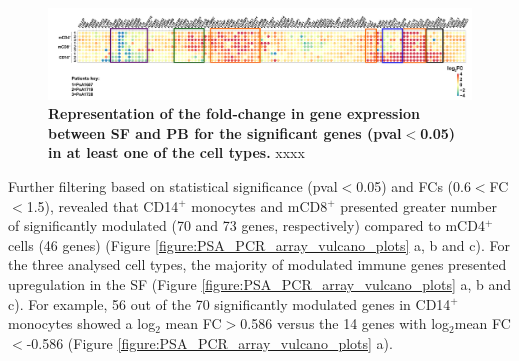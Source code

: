 \begin{landscape}
\begin{figure}[H]
\centering
\includegraphics[width=1.5\textwidth]{./Results3/pdfs/PCR_array_PSA_SF_vs_PB_filtered_5_percent_genes_heatmap}
\caption[Representation of the fold-change in gene expression between SF and PB for the significant genes (pval$<$0.05) in at least one of the cell types.]{\textbf{Representation of the fold-change in gene expression between SF and PB for the significant genes (pval$<$0.05) in at least one of the cell types.} xxxx }
\label{fig:PSA_PCR_array_5pcnt_heatmap}
\end{figure}
\end{landscape}


Further filtering based on statistical significance (pval$<$0.05) and FCs (0.6$<$FC$<$1.5), revealed that CD14$^+$ monocytes and mCD8$^+$ presented greater number of significantly modulated (70 and 73 genes, respectively) compared to mCD4$^+$ cells (46 genes) (Figure \ref{figure:PSA_PCR_array_vulcano_plots} a, b and c). For the three analysed cell types, the majority of modulated immune genes presented upregulation in the SF (Figure \ref{figure:PSA_PCR_array_vulcano_plots} a, b and c). For example, 56 out of the 70 significantly modulated genes in CD14$^+$ monocytes showed a log$_2$ mean FC$>$0.586 versus the 14 genes with log$_2$mean FC$<$-0.586 (Figure \ref{figure:PSA_PCR_array_vulcano_plots} a).



